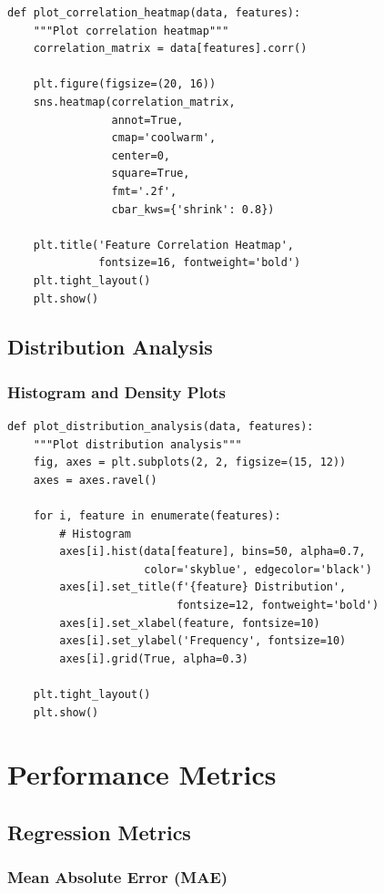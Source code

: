 \documentclass[12pt,a4paper]{article}
\begin{document}
\begin{lstlisting}
def plot_correlation_heatmap(data, features):
    """Plot correlation heatmap"""
    correlation_matrix = data[features].corr()
    
    plt.figure(figsize=(20, 16))
    sns.heatmap(correlation_matrix, 
                annot=True, 
                cmap='coolwarm', 
                center=0,
                square=True,
                fmt='.2f',
                cbar_kws={'shrink': 0.8})
    
    plt.title('Feature Correlation Heatmap', 
              fontsize=16, fontweight='bold')
    plt.tight_layout()
    plt.show()
\end{lstlisting}

\subsection{Distribution Analysis}

\subsubsection{Histogram and Density Plots}

\begin{lstlisting}
def plot_distribution_analysis(data, features):
    """Plot distribution analysis"""
    fig, axes = plt.subplots(2, 2, figsize=(15, 12))
    axes = axes.ravel()
    
    for i, feature in enumerate(features):
        # Histogram
        axes[i].hist(data[feature], bins=50, alpha=0.7, 
                     color='skyblue', edgecolor='black')
        axes[i].set_title(f'{feature} Distribution', 
                          fontsize=12, fontweight='bold')
        axes[i].set_xlabel(feature, fontsize=10)
        axes[i].set_ylabel('Frequency', fontsize=10)
        axes[i].grid(True, alpha=0.3)
    
    plt.tight_layout()
    plt.show()
\end{lstlisting}

\section{Performance Metrics}

\subsection{Regression Metrics}

\subsubsection{Mean Absolute Error (MAE)}
\end{document}
